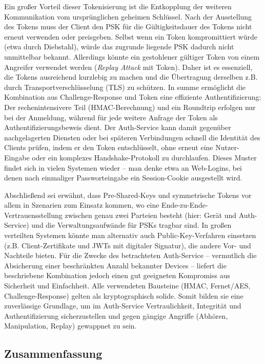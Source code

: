 Ein großer Vorteil dieser Tokenisierung ist die Entkopplung der weiteren Kommunikation vom ursprünglichen geheimen Schlüssel. Nach der Ausstellung des Tokens muss der Client den PSK für die Gültigkeitsdauer des Tokens nicht erneut verwenden oder preisgeben. Selbst wenn ein Token kompromittiert würde (etwa durch Diebstahl), würde das zugrunde liegende PSK dadurch nicht unmittelbar bekannt. Allerdings könnte ein gestohlener gültiger Token von einem Angreifer verwendet werden (\textit{Replay Attack} mit Token). Daher ist es essenziell, die Tokens ausreichend kurzlebig zu machen und die Übertragung derselben z.B. durch Transportverschlüsselung (TLS) zu schützen.
In summe ermöglicht die Kombination aus Challenge-Response und Token eine effiziente Authentifizierung: Der rechenintensivere Teil (HMAC-Berechnung) und ein Roundtrip erfolgen nur bei der Anmeldung, während für jede weitere Anfrage der Token als Authentifizierungsbeweis dient. Der Auth-Service kann damit gegenüber nachgelagerten Diensten oder bei späteren Verbindungen schnell die Identität des Clients prüfen, indem er den Token entschlüsselt, ohne erneut eine Nutzer-Eingabe oder ein komplexes Handshake-Protokoll zu durchlaufen. Dieses Muster findet sich in vielen Systemen wieder – man denke etwa an Web-Logins, bei denen nach einmaliger Passworteingabe ein Session-Cookie ausgestellt wird.

Abschließend sei erwähnt, dass Pre-Shared-Keys und symmetrische Tokens vor allem in Szenarien zum Einsatz kommen, wo eine Ende-zu-Ende-Vertrauensstellung zwischen genau zwei Parteien besteht (hier: Gerät und Auth-Service) und die Verwaltungsaufwände für PSKs tragbar sind. In großen verteilten Systemen könnte man alternativ auch Public-Key-Verfahren einsetzen (z.B. Client-Zertifikate und JWTs mit digitaler Signatur), die andere Vor- und Nachteile bieten. Für die Zwecke des betrachteten Auth-Service – vermutlich die Absicherung einer beschränkten Anzahl bekannter Devices – liefert die beschriebene Kombination jedoch einen gut geeigneten Kompromiss aus Sicherheit und Einfachheit. Alle verwendeten Bausteine (HMAC, Fernet/AES, Challenge-Response) gelten als kryptographisch solide. Somit bilden sie eine zuverlässige Grundlage, um im Auth-Service Vertraulichkeit, Integrität und Authentifizierung sicherzustellen und gegen gängige Angriffe (Abhören, Manipulation, Replay) gewappnet zu sein.

\subsection{Zusammenfassung}

